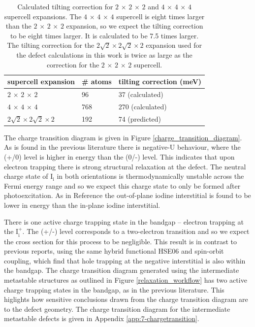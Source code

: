 \begin{table}[h!]\centering
\begin{tabular}{lll}\toprule
supercell expansion&\# atoms&tilting correction (meV) \\ 
\midrule
$2\,\times\,2\,\times\,2$ & 96 & 37 (calculated) \\
$4\,\times\,4\,\times\,4$ & 768 & 270 (calculated) \\
$2\sqrt2\times2\sqrt2\times2$ & 192 & 74 (predicted) \\
\bottomrule
\end{tabular} 
\caption[Tilting correction for $2\,\times\,2\,\times\,2$ and $4\,\times\,4\,\times\,4$ supercell expansions]{\label{modemaptable} Calculated tilting correction for $2\,\times\,2\,\times\,2$ and $4\,\times\,4\,\times\,4$ supercell expansions. The $4\,\times\,4\,\times\,4$ supercell is eight times larger than the $2\,\times\,2\,\times\,2$ expansion, so we expect the tilting correction to be eight times larger. It is calculated to be 7.5 times larger. The tilting correction for the $2\sqrt2\times2\sqrt2\times2$ expansion used for the defect calculations in this work is twice as large as the correction for the $2\,\times\,2\,\times\,2$ supercell. }
\end{table}

The charge transition diagram is given in Figure \ref{charge_transition_diagram}. 
As is found in the previous literature\autocite{Du2015,Meggiolaro2018} there is negative-U behaviour, where the (+/0) level is higher in energy than the (0/-) level. This indicates that upon electron trapping there is strong structural relaxation at the defect. The neutral charge state of $\mathrm{I}_\mathrm{i}$ in both orientations is thermodynamically unstable across the Fermi energy range and so we expect this charge state to only be formed after photoexcitation. As in Reference \cite{Meggiolaro2018} the out-of-plane iodine interstitial is found to be lower in energy than the in-plane iodine interstitial.

There is one active charge trapping state in the bandgap -- electron trapping at the $\mathrm{I}_\mathrm{i}^+$.  The (+/-) level corresponds to a two-electron transition and so we expect the cross section for this process to be negligible. This result is in contrast to previous reports, using the same hybrid functional HSE06 and spin-orbit coupling, which find that hole trapping at the negative interstitial is also within the bandgap.
The charge transition diagram generated using the intermediate metastable structures as outlined in Figure \ref{relaxation_workflow} has two active charge trapping states in the bandgap, as in the previous literature. This higlights how sensitive conclusions drawn from the charge transition diagram are to the defect geometry. The charge transition diagram for the intermediate metastable defects is given in Appendix \ref{app:7-chargetransition}.


